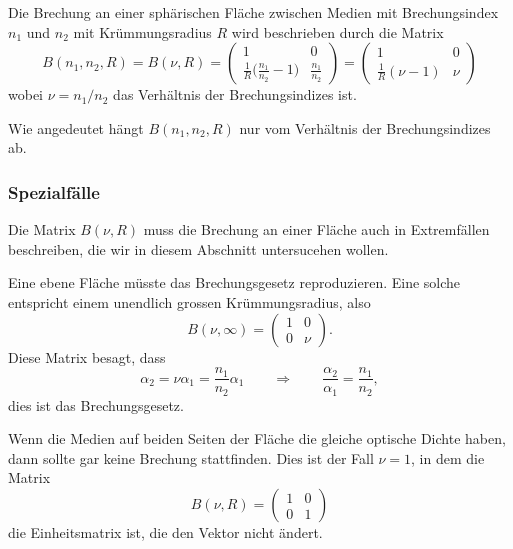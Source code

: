 \begin{definition}
Die Brechung an einer sphärischen Fläche zwischen Medien mit Brechungsindex
$n_1$ und $n_2$ mit Krümmungsradius $R$ wird beschrieben durch die Matrix
\begin{equation}
B(n_1,n_2,R)
=
B(\nu,R)
=
\begin{pmatrix}
1&0\\
\displaystyle\frac{1}{R}\biggl(\frac{n_1}{n_2}-1\biggr)
	& \displaystyle\frac{n_1}{n_2}
\end{pmatrix}
=
\begin{pmatrix}
1                  & 0  \\
\frac{1}{R}(\nu-1) & \nu
\end{pmatrix}
\label{om:Bn1n2R}
\end{equation}
wobei $\nu = n_1/n_2$ das Verhältnis der Brechungsindizes ist.
\end{definition}

Wie angedeutet hängt $B(n_1,n_2,R)$ nur vom Verhältnis der Brechungsindizes ab.

\subsubsection{Spezialfälle}
Die Matrix $B(\nu,R)$ muss die Brechung an einer Fläche auch in Extremfällen
beschreiben, die wir in diesem Abschnitt untersucehen wollen.

Eine ebene Fläche müsste das Brechungsgesetz reproduzieren.
Eine solche entspricht einem unendlich grossen Krümmungsradius, also
\[
B(\nu,\infty)
=
\begin{pmatrix}
1&0\\0&\nu
\end{pmatrix}.
\]
Diese Matrix besagt, dass
\[
\alpha_2 = \nu \alpha_1 = \frac{n_1}{n_2}\alpha_1
\qquad\Rightarrow\qquad
\frac{\alpha_2}{\alpha_1}=\frac{n_1}{n_2},
\]
dies ist das Brechungsgesetz.

Wenn die Medien auf beiden Seiten der Fläche die gleiche optische
Dichte haben, dann sollte gar keine Brechung stattfinden.
Dies ist der Fall $\nu=1$, in dem die Matrix
\[
B(\nu,R)
=
\begin{pmatrix}
1&0\\
0&1
\end{pmatrix}
\]
die Einheitsmatrix ist, die den Vektor nicht ändert.

